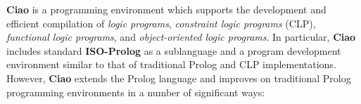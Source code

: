 \documentclass{article}
\newcommand{\inbf}[1]{{\bf #1}}
\newcommand{\enfat}[1]{{\em #1}}
\newcommand{\ciao}{\psfig{figure=ciao_s.ps}}
\begin{document}
\pagestyle{empty}

\twocolumn[

\ \rule{\textwidth}{.04 in}\\
\hspace*{0.04\textwidth}
\hbox{
      \vbox{\vspace{12pt}\hbox{\engcliplogo}}
      \hspace*{+0.25\textwidth}
      \vbox{\ciao}
}\\
\ \rule{\textwidth}{.04 in}\\ %

\begin{center}
\begin{LARGE}
\underline{{\bf Ciao Prolog 1.4 is now available}}\\ %
\end{LARGE}
\begin{Large}
{\tt ciao@dia.fi.upm.es}\\
{\tt http://www.clip.dia.fi.upm.es/Software}\\ %
\end{Large}
\end{center}
]


\inbf{Ciao} is a  programming environment which
supports the development and efficient compilation of \enfat{logic
programs}, \enfat{constraint logic programs} (CLP), \enfat{functional logic
programs}, and \enfat{object-oriented logic programs}. In particular,
\inbf{Ciao} includes standard \inbf{ISO-Prolog} as a sublanguage and a
program development environment similar to that of traditional Prolog
and CLP implementations. However, \inbf{Ciao} extends the Prolog
language and improves on traditional Prolog programming environments
in a number of significant ways:
\end{document}
